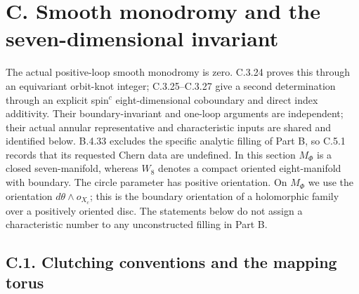 \section{C. Smooth monodromy and the seven-dimensional invariant}

The actual positive-loop smooth monodromy is zero. C.3.24 proves
this through an equivariant orbit-knot integer; C.3.25--C.3.27
give a second determination through an explicit spin$^c$
eight-dimensional coboundary and direct index additivity. Their
boundary-invariant and one-loop arguments are independent; their
actual annular representative and characteristic inputs are shared
and identified below. B.4.33 excludes the specific analytic
filling of Part B, so C.5.1 records that its requested Chern
data are undefined. In this section $M_\Phi$ is a closed seven-manifold,
whereas $W_8$ denotes a
compact oriented eight-manifold with boundary. The circle parameter
has positive orientation. On $M_\Phi$ we use the orientation
$d\theta\wedge o_{X_c}$; this is the boundary orientation of a
holomorphic family over a positively oriented disc. The statements
below do not assign a characteristic number to any unconstructed
filling in Part B.

\subsection{C.1. Clutching conventions and the mapping torus}

